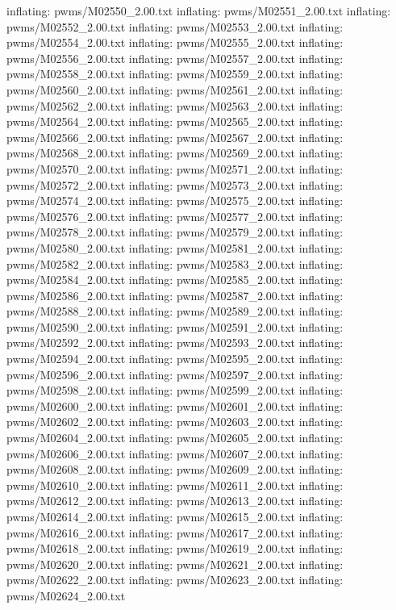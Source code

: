 \documentclass[letterpaper,10pt,english]{sphinxmanual}
\begin{document}
{\begin{sphinxVerbatim}[commandchars=\\\{\}]
  inflating: pwms/M02550\_2.00.txt
  inflating: pwms/M02551\_2.00.txt
  inflating: pwms/M02552\_2.00.txt
  inflating: pwms/M02553\_2.00.txt
  inflating: pwms/M02554\_2.00.txt
  inflating: pwms/M02555\_2.00.txt
  inflating: pwms/M02556\_2.00.txt
  inflating: pwms/M02557\_2.00.txt
  inflating: pwms/M02558\_2.00.txt
  inflating: pwms/M02559\_2.00.txt
  inflating: pwms/M02560\_2.00.txt
  inflating: pwms/M02561\_2.00.txt
  inflating: pwms/M02562\_2.00.txt
  inflating: pwms/M02563\_2.00.txt
  inflating: pwms/M02564\_2.00.txt
  inflating: pwms/M02565\_2.00.txt
  inflating: pwms/M02566\_2.00.txt
  inflating: pwms/M02567\_2.00.txt
  inflating: pwms/M02568\_2.00.txt
  inflating: pwms/M02569\_2.00.txt
  inflating: pwms/M02570\_2.00.txt
  inflating: pwms/M02571\_2.00.txt
  inflating: pwms/M02572\_2.00.txt
  inflating: pwms/M02573\_2.00.txt
  inflating: pwms/M02574\_2.00.txt
  inflating: pwms/M02575\_2.00.txt
  inflating: pwms/M02576\_2.00.txt
  inflating: pwms/M02577\_2.00.txt
  inflating: pwms/M02578\_2.00.txt
  inflating: pwms/M02579\_2.00.txt
  inflating: pwms/M02580\_2.00.txt
  inflating: pwms/M02581\_2.00.txt
  inflating: pwms/M02582\_2.00.txt
  inflating: pwms/M02583\_2.00.txt
  inflating: pwms/M02584\_2.00.txt
  inflating: pwms/M02585\_2.00.txt
  inflating: pwms/M02586\_2.00.txt
  inflating: pwms/M02587\_2.00.txt
  inflating: pwms/M02588\_2.00.txt
  inflating: pwms/M02589\_2.00.txt
  inflating: pwms/M02590\_2.00.txt
  inflating: pwms/M02591\_2.00.txt
  inflating: pwms/M02592\_2.00.txt
  inflating: pwms/M02593\_2.00.txt
  inflating: pwms/M02594\_2.00.txt
  inflating: pwms/M02595\_2.00.txt
  inflating: pwms/M02596\_2.00.txt
  inflating: pwms/M02597\_2.00.txt
  inflating: pwms/M02598\_2.00.txt
  inflating: pwms/M02599\_2.00.txt
  inflating: pwms/M02600\_2.00.txt
  inflating: pwms/M02601\_2.00.txt
  inflating: pwms/M02602\_2.00.txt
  inflating: pwms/M02603\_2.00.txt
  inflating: pwms/M02604\_2.00.txt
  inflating: pwms/M02605\_2.00.txt
  inflating: pwms/M02606\_2.00.txt
  inflating: pwms/M02607\_2.00.txt
  inflating: pwms/M02608\_2.00.txt
  inflating: pwms/M02609\_2.00.txt
  inflating: pwms/M02610\_2.00.txt
  inflating: pwms/M02611\_2.00.txt
  inflating: pwms/M02612\_2.00.txt
  inflating: pwms/M02613\_2.00.txt
  inflating: pwms/M02614\_2.00.txt
  inflating: pwms/M02615\_2.00.txt
  inflating: pwms/M02616\_2.00.txt
  inflating: pwms/M02617\_2.00.txt
  inflating: pwms/M02618\_2.00.txt
  inflating: pwms/M02619\_2.00.txt
  inflating: pwms/M02620\_2.00.txt
  inflating: pwms/M02621\_2.00.txt
  inflating: pwms/M02622\_2.00.txt
  inflating: pwms/M02623\_2.00.txt
  inflating: pwms/M02624\_2.00.txt

\end{sphinxVerbatim}}
\end{document}
